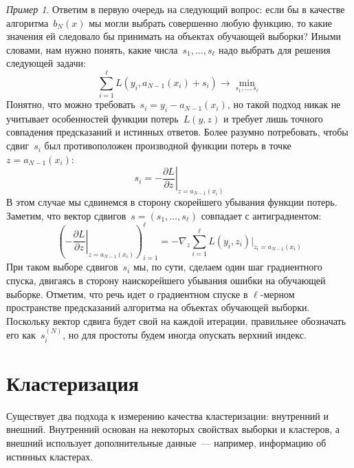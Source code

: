 \documentclass[a4paper, 12pt]{article}
\theoremstyle{plain} %
\theoremstyle{definition} %
\theoremstyle{remark} %
\newtheorem{example}{Пример}
\begin{document}
\begin{example}
Ответим в первую очередь на следующий вопрос: если бы в качестве алгоритма~$b_N(x)$ мы
могли выбрать совершенно любую функцию, то какие значения ей следовало бы принимать
на объектах обучающей выборки? Иными словами, нам нужно понять, какие числа~$s_1, \dots, s_\ell$
надо выбрать для решения следующей задачи:
\[
    \sum_{i = 1}^{\ell}
        L(y_i, a_{N - 1}(x_i) + s_i)
    \to
    \min_{s_1, \dots, s_\ell}
\]
Понятно, что можно требовать~$s_i = y_i - a_{N - 1}(x_i)$,
но такой подход никак не учитывает особенностей функции потерь~$L(y, z)$
и требует лишь точного совпадения предсказаний и истинных ответов.
Более разумно потребовать, чтобы сдвиг~$s_i$ был противоположен производной функции потерь
в точке~$z = a_{N - 1}(x_i)$:
\[
    s_i
    =
    -
    \left.
    \frac{\partial L}{\partial z}
    \right|_{z = a_{N - 1}(x_i)}
\]
В этом случае мы сдвинемся в сторону скорейшего убывания функции потерь.
Заметим, что вектор сдвигов~$s = (s_1, \dots, s_\ell)$ совпадает
с антиградиентом:
\[
    \left(
        -\left.
        \frac{\partial L}{\partial z}
        \right|_{z = a_{N - 1}(x_i)}
    \right)_{i = 1}^{\ell}
    =
    -\nabla_z
    \sum_{i = 1}^{\ell}
        L(y_i, z_i)
    \big|_{z_i = a_{N - 1}(x_i)}
\]
При таком выборе сдвигов~$s_i$ мы, по сути, сделаем один шаг градиентного спуска,
двигаясь в сторону наискорейшего убывания ошибки на обучающей выборке.
Отметим, что речь идет о градиентном спуске в $\ell$-мерном пространстве предсказаний алгоритма
на объектах обучающей выборки.
Поскольку вектор сдвига будет свой на каждой итерации, правильнее обозначать его как~$s_i^{(N)}$,
но для простоты будем иногда опускать верхний индекс.

\section{Кластеризация}

Существует два подхода к измерению качества кластеризации: внутренний и внешний.
Внутренний основан на некоторых свойствах выборки и кластеров,
а внешний использует дополнительные данные~--- например, информацию об истинных кластерах.


\end{example}
\end{document}
